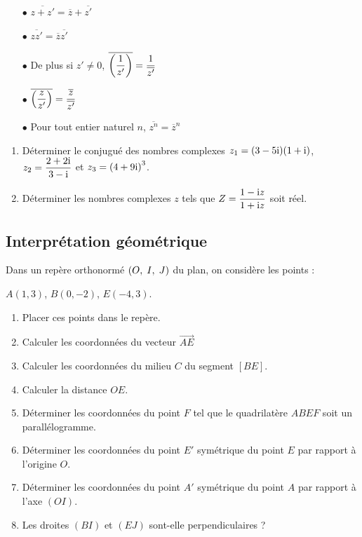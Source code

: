 \medskip

\begin{itemize}
\item[$  \bullet$]  $ \overline{z+z'} =\overline{z}+\overline{z'}$
\item[$  \bullet$]    $ \overline{z z'} =\overline{z} \overline{z'}$

\medskip

\item[$  \bullet$]  De plus si $ z'\neq 0 $, \quad $\overline{\left( \dfrac{1}{z'} \right)}= \dfrac{1}{\overline{z'}}$
\item[$  \bullet$]   $\overline{\left( \dfrac{z}{z'} \right)}= \dfrac{\overline{z}}{\overline{z'}}$
 \item[$  \bullet$] Pour tout entier naturel $ n $, \quad $ \overline{z^n} =\overline{z}^n$
\end{itemize}
\medskip

\begin{exercice}
\begin{enumerate}
\item Déterminer le conjugué des nombres complexes $ z_1= (3-5\text{i})(1+\text{i}) $, $ z_2= \dfrac{2+2\text{i}}{3-\text{i} } $ et   $z_3=\left(4+9\text{i}\right)^3 $.
\item Déterminer les nombres complexes $ z $ tels que\; $ Z=\dfrac{1-\text{i} z}{1+\text{i} z} $  soit réel.
\end{enumerate}
\end{exercice}
\subsection{ Interprétation géométrique}
\begin{lemma}
Dans un repère orthonormé   $ \left(O,\; I, \; J\right) $ du plan, on considère les points : 

$ A(1, 3) $,\; $ B(0, -2) $,\; $ E(-4, 3) $.
\begin{enumerate}
\item Placer ces points dans le repère.
\item Calculer les coordonnées du vecteur $ \overrightarrow{AE} $
\item Calculer les coordonnées du milieu $ C $ du segment  $ [BE] $.
\item Calculer la distance $ OE $.
\item  Déterminer les coordonnées du point $ F $  tel que le quadrilatère  $ ABEF $ soit un parallélogramme.
\item Déterminer les coordonnées du point $ E' $  symétrique du point $ E $ par rapport à l'origine $ O. $
\item Déterminer les coordonnées du point $ A' $  symétrique du point $ A $ par rapport à l'axe $ (OI). $
\item Les droites  $ (BI)$ et $(EJ) $ sont-elle perpendiculaires ?
\end{enumerate}
\end{lemma}
